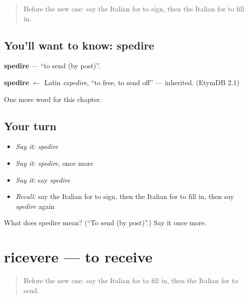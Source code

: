 \label{lesson:IT-C235-spedire}



\begin{quote}
Before the new one: say the Italian for to sign, then the Italian for to fill in.
\end{quote}

\subsection*{You'll want to know: spedire}
\textbf{spedire} — \textquotedblleft{}to send (by post)\textquotedblright{}.

\begin{cousinweb}
\textbf{spedire} $\leftarrow$ Latin \emph{expedire}, \textquotedblleft{}to free, to send off\textquotedblright{} — inherited. (EtymDB 2.1)
\end{cousinweb}

\begin{grammarlens}[title={What you've built}]
One more word for this chapter.
\end{grammarlens}

\subsection*{Your turn}
\begin{itemize}
\raggedright
  \item \emph{Say it:} \emph{spedire}
  \item \emph{Say it:} \emph{spedire}, once more
  \item \emph{Say it:} say \emph{spedire}
  \item \emph{Recall:} say the Italian for to sign, then the Italian for to fill in, then say \emph{spedire} again
\end{itemize}

\begin{tcolorbox}[breakable,colback=teal!4,colframe=teal!35!black,title={Before you move on}]
What does spedire mean? (\textquotedblleft{}To send (by post)\textquotedblright{}.) Say it once more.
\end{tcolorbox}
\section[ricevere]{ricevere — to receive}

\label{lesson:IT-C235-ricevere}



\begin{quote}
Before the new one: say the Italian for to fill in, then the Italian for to send.
\end{quote}

